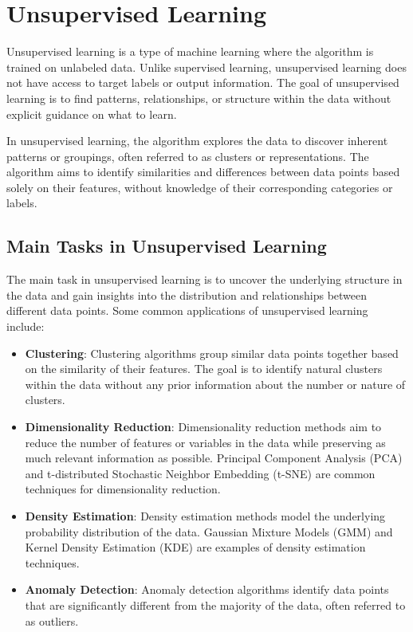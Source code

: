 \documentclass{article}
\begin{document}
\section{Unsupervised Learning}
Unsupervised learning is a type of machine learning where the algorithm is trained on unlabeled data. Unlike supervised learning, unsupervised learning does not have access to target labels or output information. The goal of unsupervised learning is to find patterns, relationships, or structure within the data without explicit guidance on what to learn.

In unsupervised learning, the algorithm explores the data to discover inherent patterns or groupings, often referred to as clusters or representations. The algorithm aims to identify similarities and differences between data points based solely on their features, without knowledge of their corresponding categories or labels.

\subsection{Main Tasks in Unsupervised Learning}
The main task in unsupervised learning is to uncover the underlying structure in the data and gain insights into the distribution and relationships between different data points. Some common applications of unsupervised learning include:

\begin{itemize}
    \item \textbf{Clustering}: Clustering algorithms group similar data points together based on the similarity of their features. The goal is to identify natural clusters within the data without any prior information about the number or nature of clusters.
    
    \item \textbf{Dimensionality Reduction}: Dimensionality reduction methods aim to reduce the number of features or variables in the data while preserving as much relevant information as possible. Principal Component Analysis (PCA) and t-distributed Stochastic Neighbor Embedding (t-SNE) are common techniques for dimensionality reduction.
    
    \item \textbf{Density Estimation}: Density estimation methods model the underlying probability distribution of the data. Gaussian Mixture Models (GMM) and Kernel Density Estimation (KDE) are examples of density estimation techniques.
    
    \item \textbf{Anomaly Detection}: Anomaly detection algorithms identify data points that are significantly different from the majority of the data, often referred to as outliers.
\end{itemize}
\end{document}
